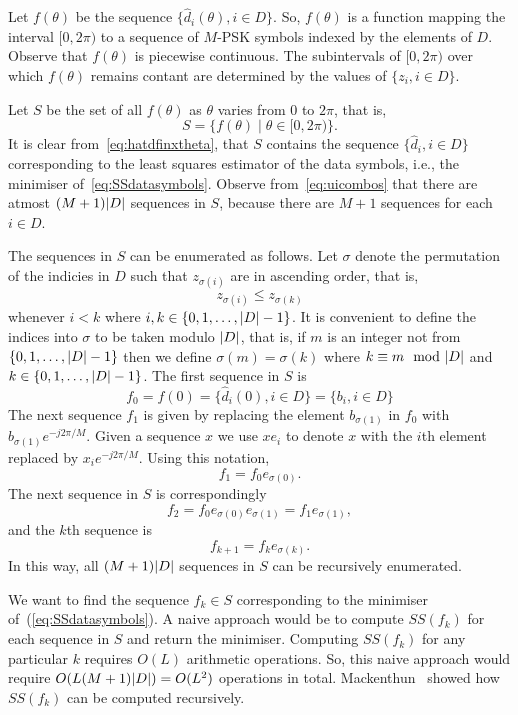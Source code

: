 \documentclass[journal]{IEEEtran}
\begin{document}
Let $f(\theta)$ be the sequence $\{ \hat{d}_i(\theta), i \in D \}$. So, $f(\theta)$ is a function mapping the interval $[0, 2\pi)$ to a sequence of $M$-PSK symbols indexed by the elements of $D$.  Observe that $f(\theta)$ is piecewise continuous.  The subintervals of $[0, 2\pi)$ over which $f(\theta)$ remains contant are determined by the values of $\{z_i, i \in D\}$.

Let $S$ be the set of all $f(\theta)$ as $\theta$ varies from $0$ to $2\pi$, that is,
\[
S = \{ f(\theta) \mid \theta \in [0, 2 \pi) \}.
\]
It is clear from~\eqref{eq:hatdfinxtheta}, that $S$ contains the sequence $\{ \hat{d}_i, i \in D \}$ corresponding to the least squares estimator of the data symbols, i.e., the minimiser of~\eqref{eq:SSdatasymbols}.  Observe from~\eqref{eq:uicombos} that there are atmost $(M+1){\left| D \right|}$ sequences in $S$, because there are $M+1$ sequences for each $i \in D$.

The sequences in $S$ can be enumerated as follows.  Let $\sigma$ denote the permutation of the indicies in $D$ such that $z_{\sigma(i)}$ are in ascending order, that is,
\begin{equation}\label{eq:sigmasortind}
z_{\sigma(i)} \leq z_{\sigma(k)}
\end{equation}
whenever $i < k $ where $i, k \in \{0, 1, \dots, {\left| D \right|}-1\}$.  It is convenient to define the indices into $\sigma$ to be taken modulo ${\left| D \right|}$, that is, if $m$ is an integer not from $\{0, 1, \dots, {\left| D \right|}-1\}$ then we define $\sigma(m) = \sigma(k)$ where $k \equiv m \mod \abs{D}$ and $k \in  \{0, 1, \dots, {\left| D \right|}-1\}$.  The first sequence in $S$ is 
\[
f_0 = f(0) = \{ \hat{d}_i(0), i \in D \} = \{ b_i, i \in D \}
\]  
The next sequence $f_1$ is given by replacing the element $b_{\sigma(1)}$ in $f_0$ with $b_{\sigma(1)}e^{-j2\pi/M}$.  Given a sequence $x$ we use $x e_i$ to denote $x$ with the $i$th element replaced by $x_i e^{-j2\pi/M}$.  Using this notation,  
\[
f_1 = f_0 e_{\sigma(0)}.
\] 
The next sequence in $S$ is correspondingly 
\[
f_2 = f_0 e_{\sigma(0)} e_{\sigma(1)} = f_1 e_{\sigma(1)},
\]
and the $k$th sequence is
\begin{equation}\label{eq:fkrec}
f_{k+1} = f_{k} e_{\sigma(k)}.
\end{equation}
In this way, all $(M+1){\left| D \right|}$ sequences in $S$ can be recursively enumerated.

We want to find the sequence $f_k \in S$ corresponding to the minimiser of~(\ref{eq:SSdatasymbols}).  A naive approach would be to compute $SS(f_k)$ for each sequence in $S$ and return the minimiser.  Computing $SS(f_k)$ for any particular $k$ requires $O(L)$ arithmetic operations.  So, this naive approach would require $O(L (M+1) {\left| D \right|}) = O(L^2)$ operations in total.  Mackenthun~\cite{Mackenthun1994} showed how $SS(f_k)$ can be computed recursively.
\end{document}
